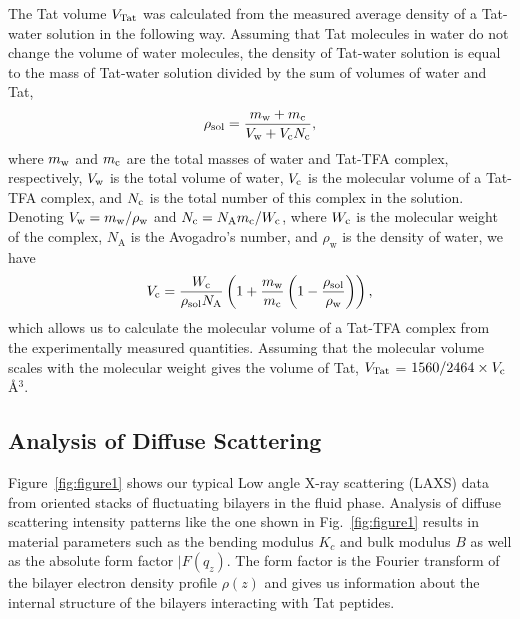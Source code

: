 The Tat volume $V_\textrm{Tat}$ was calculated from the measured average density of a 
Tat-water solution in the following way. Assuming that Tat
molecules in water do not change the volume of water molecules, the density
of Tat-water solution is equal to the mass of Tat-water solution divided
by the sum of volumes of water and Tat, 
\begin{equation}
  \rho_\textrm{sol} = \frac{m_\textrm{w}+m_\textrm{c}}{V_\textrm{w}+V_\textrm{c}N_\textrm{c}},
\end{equation}
where $m_\textrm{w}$ and $m_\textrm{c}$
are the total masses of water and Tat-TFA complex, respectively, 
$V_\textrm{w}$ is the total volume of 
water, $V_\textrm{c}$ is the molecular volume of a Tat-TFA complex, and $N_\textrm{c}$ is the total number 
of this complex in the solution. 
Denoting $V_\textrm{w}=m_\textrm{w}/\rho_\textrm{w}$ 
and $N_\textrm{c}=N_\textrm{A}m_\textrm{c}/W_\textrm{c}$, 
where $W_\textrm{c}$ is the molecular weight of the complex, 
$N_\textrm{A}$ is the Avogadro's number,
and $\rho_\textrm{w}$ is the density of water, we have
\begin{equation}
  V_\textrm{c} = \frac{W_\textrm{c}}{\rho_\textrm{sol}N_\textrm{A}} \left( 
        1 + \frac{m_\textrm{w}}{m_\textrm{c}}\left(1-\frac{\rho_\textrm{sol}}{\rho_\textrm{w}}\right) 
        \right),
\end{equation}
which allows us to calculate the molecular volume of a Tat-TFA complex 
from the experimentally measured quantities. 
Assuming that the molecular
volume scales with the molecular weight gives the volume of Tat, 
$V_\textrm{Tat}$ = $1560/2464\times V_\textrm{c}$ \AA$^3$. 

\subsection{Analysis of Diffuse Scattering}
Figure~\ref{fig:figure1} shows our typical Low angle X-ray scattering (LAXS) data 
from oriented stacks of fluctuating bilayers in the fluid phase. Analysis of diffuse scattering 
intensity patterns like the one shown in Fig.~\ref{fig:figure1} results in material 
parameters such as the bending modulus $K_c$ and bulk modulus $B$ as well as
the absolute form factor $|F(q_z)$. 
The form factor is the Fourier transform of the bilayer electron 
density profile $\rho(z)$ and gives us information about the internal structure of the
bilayers interacting with Tat peptides.

